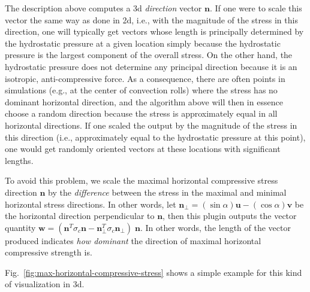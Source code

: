 \begin{itemize}
The description above computes a 3d \textit{direction} vector $\mathbf n$. If one were to scale this vector the same way as done in 2d, i.e., with the magnitude of the stress in this direction, one will typically get vectors whose length is principally determined by the hydrostatic pressure at a given location simply because the hydrostatic pressure is the largest component of the overall stress. On the other hand, the hydrostatic pressure does not determine any principal direction because it is an isotropic, anti-compressive force. As a consequence, there are often points in simulations (e.g., at the center of convection rolls) where the stress has no dominant horizontal direction, and the algorithm above will then in essence choose a random direction because the stress is approximately equal in all horizontal directions. If one scaled the output by the magnitude of the stress in this direction (i.e., approximately equal to the hydrostatic pressure at this point), one would get randomly oriented vectors at these locations with significant lengths.

To avoid this problem, we scale the maximal horizontal compressive stress direction $\mathbf n$ by the \textit{difference} between the stress in the maximal and minimal horizontal stress directions. In other words, let $\mathbf n_\perp=(\sin \alpha)\mathbf u - (\cos\alpha)\mathbf v$ be the horizontal direction perpendicular to $\mathbf n$, then this plugin outputs the vector quantity $\mathbf w = (\mathbf n^T \sigma_c \mathbf n                -\mathbf n^T_\perp \sigma_c \mathbf n_\perp)               \; \mathbf n$. In other words, the length of the vector produced indicates \textit{how dominant} the direction of maximal horizontal compressive strength is.

Fig.~\ref{fig:max-horizontal-compressive-stress} shows a simple example for this kind of visualization in 3d.


\end{itemize}
